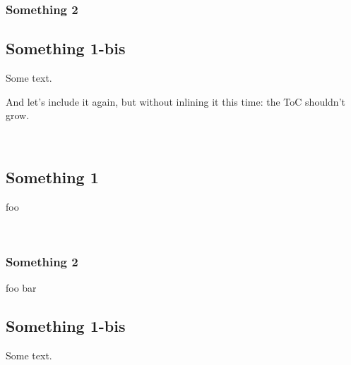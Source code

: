 \subsubsection{Something 2\label{Include_sections--something-2_4}}%
\subsection{Something 1-bis\label{Include_sections--something-1-bis_4}}%
Some text.

And let's include it again, but without inlining it this time: the ToC shouldn't grow.

 \hyperref[Include_sections-module-type-Something]{}\label{Include_sections--val-something}\\
\subsection{Something 1\label{Include_sections--something-1_5}}%
foo

\label{Include_sections--val-foo}\\
\subsubsection{Something 2\label{Include_sections--something-2_5}}%
\label{Include_sections--val-bar}\begin{ocamlindent}foo bar\end{ocamlindent}%
\medbreak
\subsection{Something 1-bis\label{Include_sections--something-1-bis_5}}%
Some text.



